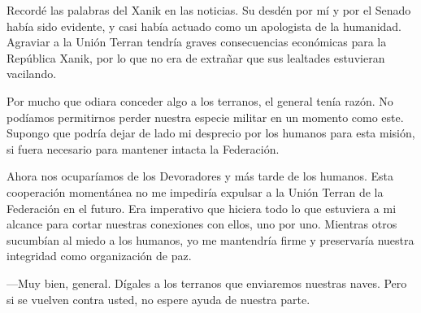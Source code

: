 Recordé las palabras del Xanik en las noticias. Su desdén por mí y por el Senado había sido evidente, y casi había actuado como un apologista de la humanidad. Agraviar a la Unión Terran tendría graves consecuencias económicas para la República Xanik, por lo que no era de extrañar que sus lealtades estuvieran vacilando.

Por mucho que odiara conceder algo a los terranos, el general tenía razón. No podíamos permitirnos perder nuestra especie militar en un momento como este. Supongo que podría dejar de lado mi desprecio por los humanos para esta misión, si fuera necesario para mantener intacta la Federación.

Ahora nos ocuparíamos de los Devoradores y más tarde de los humanos. Esta cooperación momentánea no me impediría expulsar a la Unión Terran de la Federación en el futuro. Era imperativo que hiciera todo lo que estuviera a mi alcance para cortar nuestras conexiones con ellos, uno por uno. Mientras otros sucumbían al miedo a los humanos, yo me mantendría firme y preservaría nuestra integridad como organización de paz.

—Muy bien, general. Dígales a los terranos que enviaremos nuestras naves. Pero si se vuelven contra usted, no espere ayuda de nuestra parte.